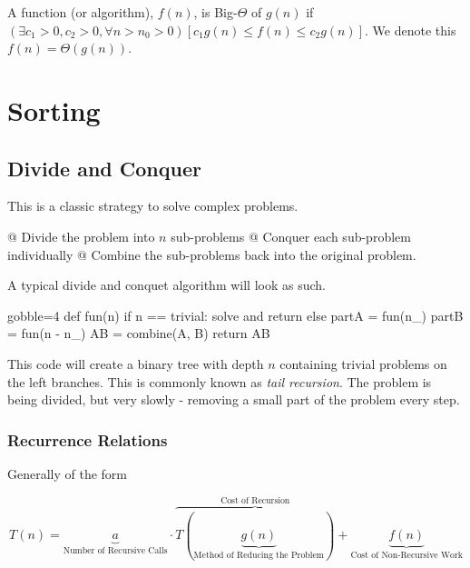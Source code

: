 \documentclass[10pt]{article}
\begin{document}
    \begin{thm}
        A function (or algorithm), $f(n)$, is Big-$\Theta$ of $g(n)$ if $ (\exists c_1 > 0, c_2 > 0, \forall n > n_0 > 0)[c_1 g(n) \le f(n) \le c_2 g(n)] $. We denote this $f(n) = \Theta(g(n))$.
    \end{thm}

\section{Sorting}
    \subsection{Divide and Conquer}

    This is a classic strategy to solve complex problems.

    \NewList
    \begin{easylist}[enumerate]
        @ Divide the problem into $n$ sub-problems
        @ Conquer each sub-problem individually
        @ Combine the sub-problems back into the original problem.
    \end{easylist}

    A typical divide and conquet algorithm will look as such.

    \begin{pythoncode*}{gobble=4}
        def fun(n)
            if n == trivial:
                solve and return
            else
                partA = fun(n_)
                partB = fun(n - n_)
                AB    = combine(A, B)
                return AB
    \end{pythoncode*}

    This code will create a binary tree with depth $n$ containing trivial problems on the left branches. This is commonly known as \textit{tail recursion}. The problem is being divided, but very slowly - removing a small part of the problem every step.

        \subsubsection{Recurrence Relations}
        Generally of the form

            \[ T(n) = \underbrace{a}_{\text{Number of Recursive Calls} } \cdot
                        \overbrace{T(\underbrace{g(n)}_{\text{Method of Reducing the Problem} })}^{\text{Cost of Recursion} } +
                        \underbrace{f(n)}_{\text{Cost of Non-Recursive Work} } \]
\end{document}
